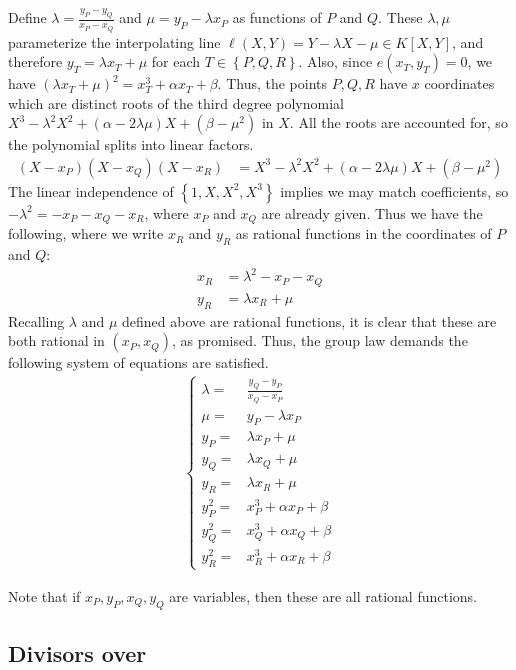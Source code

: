 \documentclass[11pt,letterpaper]{article}
\theoremstyle{definition}
\newcommand{\6}{\mathbf}
\newcommand{\7}{\mathcal}
\begin{document}
Define $\lambda = \frac{y_P - y_Q}{x_P - x_Q}$ and $\mu = y_P - \lambda x_P$ as functions of $P$ and $Q$.
These $\lambda, \mu$ parameterize the interpolating line $\ell(X,Y) = Y - \lambda X - \mu \in K[X,Y]$, and therefore $y_T = \lambda x_T + \mu$ for each $T \in \left\{P, Q, R\right\}$.  Also, since $e(x_T, y_T) = 0$, we have $(\lambda x_T + \mu)^2 = x_T^3 + \alpha x_T + \beta$. Thus, the points $P, Q, R$ have $x$ coordinates which are distinct roots of the third degree polynomial $X^3 - \lambda^2 X^2 + (\alpha - 2\lambda \mu)X + (\beta - \mu^2)$ in $X$.
All the roots are accounted for, so the polynomial splits into linear factors. 
\begin{align}
(X-x_P)(X-x_Q)(X-x_R) &= X^3 - \lambda^2 X^2 + (\alpha - 2\lambda \mu)X + (\beta - \mu^2) 
\end{align}
The linear independence of $\left\{1,X,X^2,X^3\right\}$ implies we may match coefficients, so $-\lambda^2 = -x_P - x_Q - x_R$, where $x_P$ and $x_Q$ are already given. Thus we have the following, where we write $x_R$ and $y_R$ as rational functions in the coordinates of $P$ and $Q$:
\begin{align}
x_R &= \lambda^2 - x_P - x_Q \\ 
y_R &= \lambda x_R + \mu
\end{align}
Recalling $\lambda$ and $\mu$ defined above are rational functions, it is clear that these are both rational in $(x_P, x_Q)$, as promised. Thus, the group law demands the following system of equations are satisfied.
\begin{align}
\begin{cases} 
\lambda =& \frac{y_Q-y_P}{x_Q-x_P} \\
\mu =& y_P - \lambda x_P \\
y_P =& \lambda x_P + \mu\\
y_Q =& \lambda x_Q + \mu\\
y_R =& \lambda x_R + \mu\\
y_P^2 =& x_P^3 + \alpha x_P + \beta \\
y_Q^2 =& x_Q^3 + \alpha x_Q + \beta \\
y_R^2 =& x_R^3 + \alpha x_R + \beta \label{thesystem}
\end{cases}
\end{align}

Note that if $x_P, y_P, x_Q, y_Q$ are variables, then these are all rational functions.


\subsection{Divisors over \protect{$\E$}}
\end{document}
